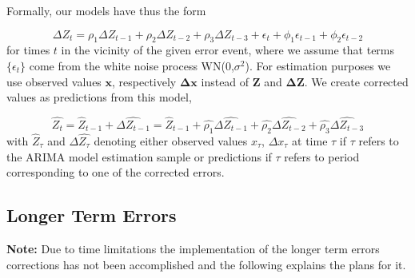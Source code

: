 \documentclass[12pt,a4paper]{article}
\begin{document}

Formally, our models have thus the form

$$ \Delta Z_t = \rho_1 \Delta Z_{t-1} + \rho_2 \Delta Z_{t-2} +\rho_3 \Delta Z_{t-3} + \epsilon_t +\phi_1 \epsilon_{t-1} + \phi_2 \epsilon_{t-2} $$
for times $t$ in the vicinity of the given error event, where we assume that terms $\lbrace \epsilon_t \rbrace$ come from the white noise process WN(0,$\sigma ^{2}$). For estimation purposes we use observed values $\mathbf{x}$, respectively $\mathbf{\Delta x}$ instead of $\mathbf{Z}$ and  $\mathbf{\Delta Z}$.
We create corrected values as predictions from this model,

$$\hat{Z_t} = \hat{Z}_{t-1} + \hat{\Delta Z_{t-1}} = \hat{Z}_{t-1} + \hat{\rho_1} \hat{\Delta Z_{t-1}} + \hat{\rho_2} \hat{\Delta Z_{t-2}} +\hat{\rho_3} \hat{\Delta Z_{t-3}} $$
with $\hat{Z}_{\tau}$ and $\Delta\hat{ Z_{\tau}}$ denoting either observed values $x_{\tau}$,  $\Delta x_{\tau}$ at time $\tau$ if $\tau$ refers to the ARIMA model estimation sample or predictions if $\tau$ refers to  period corresponding to one of the corrected errors.






\subsection{Longer Term Errors}
\textbf{Note:} Due to time limitations the implementation of the longer term errors corrections has not been accomplished and the following explains the plans for it.
\end{document}
